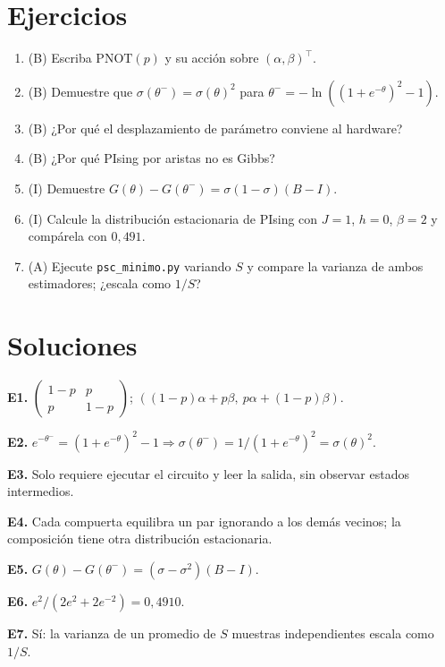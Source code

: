\documentclass[11pt,a4paper]{article}
\begin{document}
\section{Ejercicios}
\begin{enumerate}[label=\textbf{E\arabic*.}]
\item (B) Escriba $\mathrm{PNOT}(p)$ y su acción sobre $(\alpha,\beta)^\top$.
\item (B) Demuestre que $\sigma(\theta^-)=\sigma(\theta)^2$ para $\theta^-=-\ln((1+e^{-\theta})^2-1)$.
\item (B) ¿Por qué el desplazamiento de parámetro conviene al hardware?
\item (B) ¿Por qué PIsing por aristas no es Gibbs?
\item (I) Demuestre $G(\theta)-G(\theta^-)=\sigma(1-\sigma)(B-I)$.
\item (I) Calcule la distribución estacionaria de PIsing con $J=1$, $h=0$, $\beta=2$ y compárela con $0{,}491$.
\item (A) Ejecute \texttt{psc\_minimo.py} variando $S$ y compare la varianza de ambos estimadores; ¿escala como $1/S$?
\end{enumerate}
\section{Soluciones}
\begin{solucion}
\textbf{E1.} $\left(\begin{smallmatrix}1-p&p\\p&1-p\end{smallmatrix}\right)$; $((1-p)\alpha+p\beta,\ p\alpha+(1-p)\beta)$.

\textbf{E2.} $e^{-\theta^-}=(1+e^{-\theta})^2-1\Rightarrow\sigma(\theta^-)=1/(1+e^{-\theta})^2=\sigma(\theta)^2$.

\textbf{E3.} Solo requiere ejecutar el circuito y leer la salida, sin observar estados intermedios.

\textbf{E4.} Cada compuerta equilibra un par ignorando a los demás vecinos; la composición tiene otra distribución estacionaria.

\textbf{E5.} $G(\theta)-G(\theta^-)=(\sigma-\sigma^2)(B-I)$.

\textbf{E6.} $e^{2}/(2e^{2}+2e^{-2})=0{,}4910$.

\textbf{E7.} Sí: la varianza de un promedio de $S$ muestras independientes escala como $1/S$.
\end{solucion}
\end{document}
